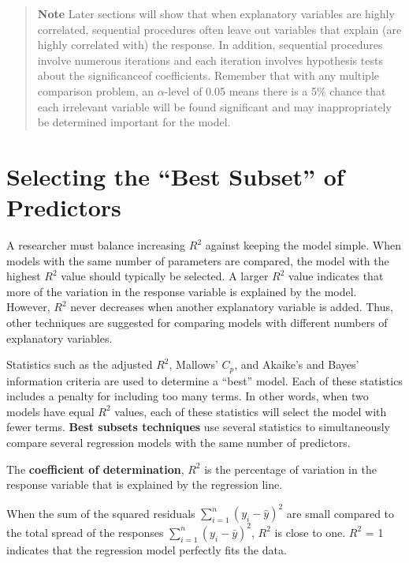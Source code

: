 \documentclass[
]{report}
\begin{document}
\begin{quote}
\textbf{Note} Later sections will show that when explanatory variables are highly correlated, sequential procedures often leave out variables that explain (are highly correlated with) the response. In addition, sequential procedures involve numerous iterations and each iteration involves hypothesis tests about the significanceof coefficients. Remember that with any multiple comparison problem, an \(\alpha\)-level of 0.05 means there is a 5\% chance that each irrelevant variable will be found significant and may inappropriately be determined important for the model.
\end{quote}

\section*{Selecting the ``Best Subset'' of Predictors}\label{selecting-the-best-subset-of-predictors}

A researcher must balance increasing \(R^2\) against keeping the model simple. When models with the same number of parameters are compared, the model with the highest \(R^2\) value should typically be selected. A larger \(R^2\) value indicates that more of the variation in the response variable is explained by the model. However, \(R^2\) never decreases when another explanatory variable is added. Thus, other techniques are suggested for comparing models with different numbers of explanatory variables.

Statistics such as the adjusted \(R^2\), Mallows' \(C_p\), and Akaike's and Bayes' information criteria are used to determine a ``best'' model. Each of these statistics includes a penalty for including too many terms. In other words, when two models have equal \(R^2\) values, each of these statistics will select the model with fewer terms. \textbf{Best subsets techniques} use several statistics to simultaneously compare several regression models with the same number of predictors.

The \textbf{coefficient of determination}, \textbf{\(R^2\)} is the percentage of variation in the response variable that is explained by the regression line.

When the sum of the squared residuals \({\sum_{i=1}^{n}({y}_i - \hat{y})^2}\) are small compared to the total spread of the responses \({\sum_{i=1}^{n}({y}_i - \bar{y})^2}\), \(R^2\) is close to one. \(R^2\) = 1 indicates that the regression model perfectly fits the data.
\end{document}
